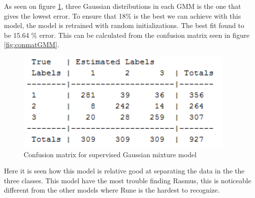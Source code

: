 As seen on figure \ref{fig:fitGMM}, three Gaussian distributions in each GMM is the one that gives the lowest error. To ensure that 18\% is the best we can achieve with this model, the model is retrained with random initializations. The best fit found to be 15.64 \% error. This can be calculated from the confusion matrix seen in figure \ref{fig:conmatGMM}. 

\begin{figure}[H]
\centering
\includegraphics[scale=0.7]{billeder/conmatgmm}
\caption{Confusion matrix for supervised Gaussian mixture model }
\label{fig:fitGMM}
\end{figure}

Here it is seen how this model is relative good at separating the data in the  the three classes. This model have the most trouble finding Rasmus, this is noticeable different from the other models where Rune is the hardest to recognize. 

